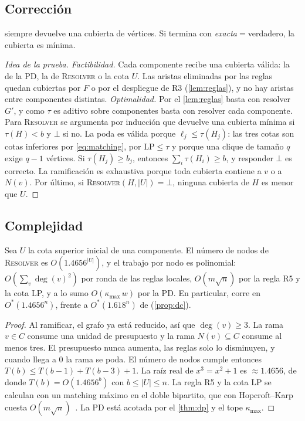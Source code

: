 \subsection{Corrección}
\begin{theorem}\label{thm:hyvc}
\hyvc{} siempre devuelve una cubierta de vértices. Si termina con \textit{exacta}$=$verdadero, la cubierta es mínima.
\end{theorem}
\begin{proof}[Idea de la prueba]
\emph{Factibilidad.} Cada componente recibe una cubierta válida: la de la PD, la de \textsc{Resolver} o la cota $U$. Las aristas eliminadas por las reglas quedan cubiertas por $F$ o por el despliegue de R3 (\cref{lem:reglas}), y no hay aristas entre componentes distintas.
\emph{Optimalidad.} Por el \cref{lem:reglas} basta con resolver $G'$, y como $\tau$ es aditivo sobre componentes basta con resolver cada componente. Para \textsc{Resolver} se argumenta por inducción que devuelve una cubierta mínima si $\tau(H)<b$ y $\bot$ si no. La poda es válida porque $\ell_j\le\tau(H_j)$: las tres cotas son cotas inferiores por \eqref{eq:matching}, por $\mathrm{LP}\le\tau$ y porque una clique de tamaño $q$ exige $q-1$ vértices. Si $\tau(H_j)\ge b_j$, entonces $\sum_i\tau(H_i)\ge b$, y responder $\bot$ es correcto. La ramificación es exhaustiva porque toda cubierta contiene a $v$ o a $N(v)$. Por último, si \textsc{Resolver}$(H,|U|)=\bot$, ninguna cubierta de $H$ es menor que $U$.
\end{proof}

\subsection{Complejidad}
\begin{theorem}\label{thm:hyvc-cx}
Sea $U$ la cota superior inicial de una componente. El número de nodos de \textsc{Resolver} es $O(1.4656^{|U|})$, y el trabajo por nodo es polinomial: $O(\sum_v\deg(v)^2)$ por ronda de las reglas locales, $O(m\sqrt n)$ por la regla R5 y la cota LP, y a lo sumo $O(\kappa_{\max}\,w)$ por la PD. En particular, \hyvc{} corre en $O^*(1.4656^{n})$, frente a $O^*(1.618^{n})$ de  (\cref{prop:dc}).
\end{theorem}
\begin{proof}
Al ramificar, el grafo ya está reducido, así que $\deg(v)\ge 3$. La rama $v\in C$ consume una unidad de presupuesto y la rama $N(v)\subseteq C$ consume al menos tres. El presupuesto nunca aumenta, las reglas solo lo disminuyen, y cuando llega a $0$ la rama se poda. El número de nodos cumple entonces $T(b)\le T(b-1)+T(b-3)+1$. La raíz real de $x^3=x^2+1$ es $\approx1.4656$, de donde $T(b)=O(1.4656^b)$ con $b\le|U|\le n$. La regla R5 y la cota LP se calculan con un matching máximo en el doble bipartito, que con Hopcroft--Karp cuesta $O(m\sqrt n)$~\citep{hopcroft1973}. La PD está acotada por el \cref{thm:dp} y el tope $\kappa_{\max}$.
\end{proof}

